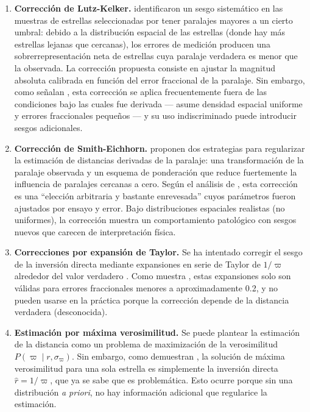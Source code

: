 \documentclass[stu, 12pt, letterpaper, donotrepeattitle, floatsintext, natbib]{apa7_ula}
\begin{document}
\begin{enumerate}
    \item \textbf{Corrección de Lutz-Kelker.} \citet{Lutz_Kelker_1973}
    identificaron un sesgo sistemático en las muestras de estrellas
    seleccionadas por tener paralajes mayores a un cierto umbral:
    debido a la distribución espacial de las estrellas (donde hay
    más estrellas lejanas que cercanas), los errores de medición
    producen una sobrerrepresentación neta de estrellas cuya paralaje
    verdadera es menor que la observada. La corrección propuesta
    consiste en ajustar la magnitud absoluta calibrada en función
    del error fraccional de la paralaje. Sin embargo, como señalan
    \citet{luri2018gaia}, esta corrección se aplica frecuentemente
    fuera de las condiciones bajo las cuales fue derivada --- asume
    densidad espacial uniforme y errores fraccionales pequeños ---
    y su uso indiscriminado puede introducir sesgos adicionales.

    \item \textbf{Corrección de Smith-Eichhorn.} \citet{Smith_Eichhorn_1996}
    proponen dos estrategias para regularizar la estimación de
    distancias derivadas de la paralaje: una transformación de la
    paralaje observada y un esquema de ponderación que reduce
    fuertemente la influencia de paralajes cercanas a cero. Según el
    análisis de \citet{luri2018gaia},
    esta corrección es una ``elección arbitraria y bastante
    enrevesada'' cuyos parámetros fueron ajustados por ensayo y
    error. Bajo distribuciones espaciales realistas (no uniformes),
    la corrección muestra un comportamiento patológico con sesgos
    nuevos que carecen de interpretación física.

    \item \textbf{Correcciones por expansión de Taylor.} Se ha
    intentado corregir el sesgo de la inversión directa
    mediante expansiones en serie de Taylor de $1/\varpi$ alrededor
    del valor verdadero \citep[ver][y las referencias allí
    citadas]{Bailer_2015}. Como muestra \citet{Bailer_2015}, estas
    expansiones solo son válidas para errores fraccionales menores
    a aproximadamente 0.2, y no pueden usarse en la práctica porque
    la corrección depende de la distancia verdadera (desconocida).

    \item \textbf{Estimación por máxima verosimilitud.} Se puede
    plantear la estimación de la distancia como un problema de
    maximización de la verosimilitud $P(\varpi \mid r,
    \sigma_\varpi)$. Sin embargo, como demuestran
    \citet{luri2018gaia}, la solución de máxima verosimilitud para
    una sola estrella es simplemente la inversión directa
    $\hat{r} = 1/\varpi$, que ya se sabe que es problemática.
    Esto ocurre porque sin una distribución \textit{a priori}, no
    hay información adicional que regularice la estimación.
\end{enumerate}
\end{document}
